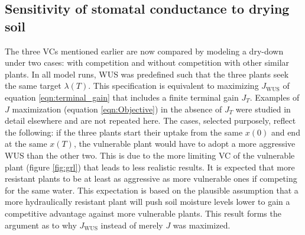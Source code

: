 \documentclass[utf8]{frontiersSCNS} %
\begin{document}



\subsection{Sensitivity of stomatal conductance to drying soil}

The three VCs mentioned earlier are now compared by modeling a dry-down under two cases: with competition and without competition with other similar plants. In all model runs, WUS was predefined such that the three plants seek the same target $\lambda(T)$. This specification is equivalent to maximizing $J_{\text{WUS}}$ of equation \ref{eqn:terminal_gain} that includes a finite terminal gain $J_T$. Examples of $J$ maximization (equation \ref{eqn:Objective}) in the absence of $J_T$ were studied in detail elsewhere \citep{manzoni_optimization_2013} and are not repeated here. The cases, selected purposely, reflect the following: if the three plants start their uptake from the same $x(0)$ and end at the same $x(T)$, the vulnerable plant would have to adopt a more aggressive WUS than the other two. This is due to the more limiting VC of the vulnerable plant (figure \ref{fig:grl}) that leads to less realistic results. It is expected that more resistant plants to be at least as aggressive as more vulnerable ones if competing for the same water. This expectation is based on the plausible assumption that a more hydraulically resistant plant will push soil moisture levels lower to gain a competitive advantage against more vulnerable plants. This result forms the argument as to why $J_{\text{WUS}}$ instead of merely $J$ was maximized.
\end{document}
